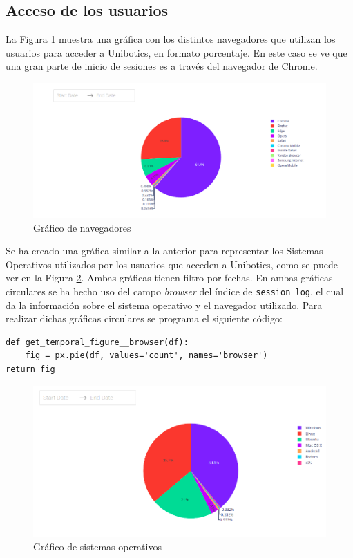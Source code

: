 \subsection{Acceso de los usuarios}
La Figura \ref{fig:browser} muestra una gráfica con los distintos navegadores que utilizan los usuarios para acceder a Unibotics, en formato porcentaje. En este caso se ve que una gran parte de inicio de sesiones es a través del navegador de Chrome. 


\begin{figure}[H]
    \centering
    \includegraphics[width=18cm, keepaspectratio]{img/browser.png}
    \caption{Gráfico de navegadores}
    \label{fig:browser}
\end{figure}
Se ha creado una gráfica similar a la anterior para representar los Sistemas Operativos utilizados por los usuarios que acceden a Unibotics, como se puede ver en la Figura \ref{fig:os}. Ambas gráficas tienen filtro por fechas. En ambas gráficas circulares se ha hecho uso del campo \textit{browser} del índice de \texttt{session\_log}, el cual da la información sobre el sistema operativo y el navegador utilizado. Para realizar dichas gráficas circulares se programa el siguiente código:
\begin{verbatim}
def get_temporal_figure__browser(df):
    fig = px.pie(df, values='count', names='browser')
return fig
\end{verbatim}

\begin{figure}[H]
    \centering
    \includegraphics[width=15cm, keepaspectratio]{img/os.png}
    \caption{Gráfico de sistemas operativos}
    \label{fig:os}
\end{figure}
